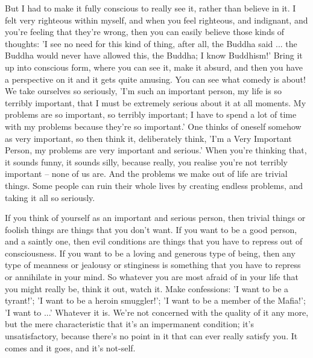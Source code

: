 But I had to make it fully conscious to really see it, rather than believe in it. I felt very righteous within myself, and when you feel righteous, and indignant, and you're feeling that they're wrong, then you can easily believe those kinds of thoughts: 'I see no need for this kind of thing, after all, the Buddha said ... the Buddha would never have allowed this, the Buddha; I know Buddhism!' Bring it up into conscious form, where you can see it, make it absurd, and then you have a perspective on it and it gets quite amusing. You can see what comedy is about! We take ourselves so seriously, 'I'm such an important person, my life is so terribly important, that I must be extremely serious about it at all moments. My problems are so important, so terribly important; I have to spend a lot of time with my problems because they're so important.' One thinks of oneself somehow as very important, so then think it, deliberately think, 'I'm a Very Important Person, my problems are very important and serious.' When you're thinking that, it sounds funny, it sounds silly, because really, you realise you're not terribly important -- none of us are. And the problems we make out of life are trivial things. Some people can ruin their whole lives by creating endless problems, and taking it all so seriously.

If you think of yourself as an important and serious person, then trivial things or foolish things are things that you don't want. If you want to be a good person, and a saintly one, then evil conditions are things that you have to repress out of consciousness. If you want to be a loving and generous type of being, then any type of meanness or jealousy or stinginess is something that you have to repress or annihilate in your mind. So whatever you are most afraid of in your life that you might really be, think it out, watch it. Make confessions: 'I want to be a tyrant!'; 'I want to be a heroin smuggler!'; 'I want to be a member of the Mafia!'; 'I want to ...' Whatever it is. We're not concerned with the quality of it any more, but the mere characteristic that it's an impermanent condition; it's unsatisfactory, because there's no point in it that can ever really satisfy you. It comes and it goes, and it's not-self.


